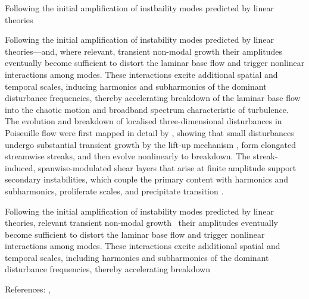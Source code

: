 Following the initial amplification of instbaility modes predicted by linear theories 

Following the initial amplification of instability modes predicted by linear theories—and, where relevant, transient non-modal growth \citep{ButlerFarrell1991,Trefethen1993,SchmidHenningson2001} their amplitudes eventually become sufficient to distort the laminar base flow and trigger nonlinear interactions among modes. These interactions excite additional spatial and temporal scales, inducing harmonics and subharmonics of the dominant disturbance frequencies, thereby accelerating breakdown of the laminar base flow into the chaotic motion and broadband spectrum characteristic of turbulence. The evolution and breakdown of localised three-dimensional disturbances in Poiseuille flow were first mapped in detail by \citet{Henningson1993}, showing that small disturbances undergo substantial transient growth by the lift-up mechanism \citep{Landahl1975}, form elongated streamwise streaks, and then evolve nonlinearly to breakdown. The streak-induced, spanwise-modulated shear layers that arise at finite amplitude support secondary instabilities, which couple the primary content with harmonics and subharmonics, proliferate scales, and precipitate transition \citep{Herbert1988,Kachanov1994,ReedSaricArnal1996}. 



Following the initial amplification of instability modes predicted by linear theories, relevant transient non-modal growth~\citep{ButlerFarrell1991} their amplitudes eventually become sufficient to distort the laminar base flow and trigger nonlinear interactions among modes. These interactions excite adiditional spatial and temporal scales, including harmonics and subharmonics of the dominant disturbance frequencies, thereby accelerating breakdown 

References:
\citep{ButlerFarrell1991}, 
\citep{Trefethen1993}
\citep{SchmidHenningson2001}
\citep{Hanifi1996}
\citep{Andersson2001}
\citep{BrandtHenningson2002}
\citep{alam_sandham_2000}



